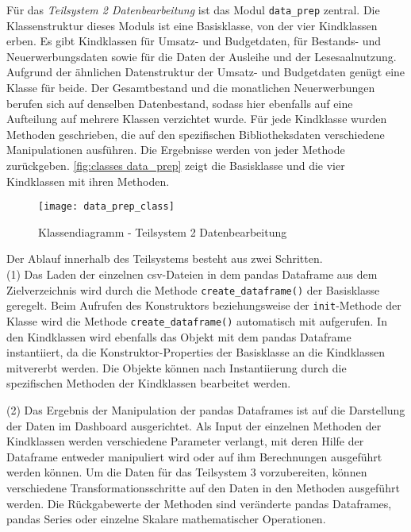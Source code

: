     Für das \textit{Teilsystem 2 Datenbearbeitung} ist das Modul \texttt{data\_prep} zentral. Die Klassenstruktur dieses Moduls ist eine 
    Basisklasse, von der vier Kindklassen erben. Es gibt Kindklassen für Umsatz- und Budgetdaten, für Bestands- und Neuerwerbungsdaten sowie für die Daten der Ausleihe und 
    der Lesesaalnutzung. Aufgrund der ähnlichen Datenstruktur der Umsatz- und Budgetdaten genügt eine Klasse für beide.
    Der Gesamtbestand und die monatlichen Neuerwerbungen berufen sich auf denselben Datenbestand, sodass hier ebenfalls auf eine Aufteilung auf mehrere Klassen verzichtet wurde.
    Für jede Kindklasse wurden Methoden geschrieben, die auf den spezifischen Bibliotheksdaten verschiedene Manipulationen ausführen.
    Die Ergebnisse werden von jeder Methode zurückgeben. \autoref{fig:classes data_prep} zeigt die Basisklasse und die vier Kindklassen mit ihren Methoden.

    \begin{sidewaysfigure}

        \centering
            \texttt{[image: data\_prep\_class]}
            \caption{Klassendiagramm - Teilsystem 2 Datenbearbeitung}
            \label{fig:classes data_prep}
    \end{sidewaysfigure}

    Der Ablauf innerhalb des Teilsystems besteht aus zwei Schritten.\\
    (1) Das Laden der einzelnen csv-Dateien in dem pandas Dataframe aus dem Zielverzeichnis wird durch die Methode \texttt{create\_dataframe()} der Basisklasse geregelt.
    Beim Aufrufen des Konstruktors beziehungsweise der \texttt{init}-Methode der Klasse wird die Methode \texttt{create\_dataframe()} 
    automatisch mit aufgerufen. In den Kindklassen wird ebenfalls das Objekt mit dem pandas Dataframe instantiiert, da die Konstruktor-Properties der Basisklasse 
    an die Kindklassen mitvererbt werden. Die Objekte können nach Instantiierung durch die spezifischen Methoden der Kindklassen bearbeitet werden.
    
    (2) Das Ergebnis der Manipulation der pandas Dataframes ist auf die Darstellung der Daten im Dashboard ausgerichtet. Als Input der einzelnen Methoden der
    Kindklassen werden verschiedene Parameter verlangt, mit deren Hilfe der Dataframe entweder manipuliert wird oder auf ihm Berechnungen ausgeführt werden können. 
    Um die Daten für das Teilsystem 3 vorzubereiten, können verschiedene Transformationsschritte auf den Daten in den Methoden ausgeführt werden. 
    Die Rückgabewerte der Methoden sind veränderte pandas Dataframes, pandas Series oder einzelne Skalare mathematischer Operationen.
    
